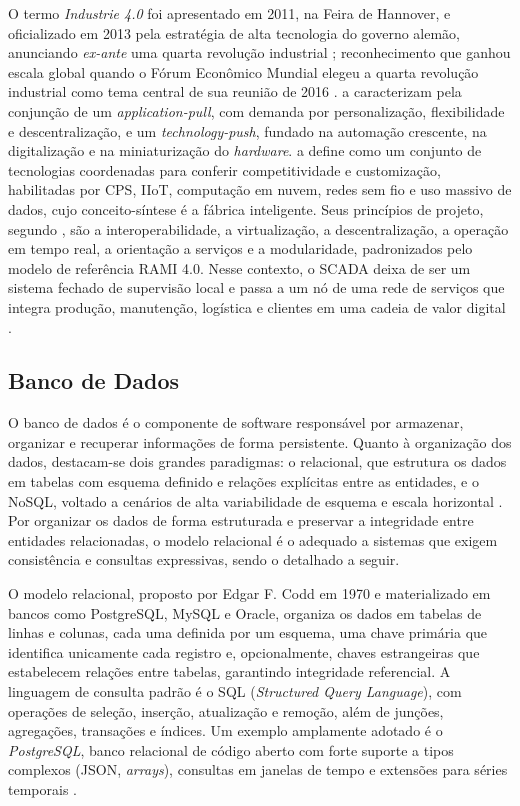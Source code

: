\par O termo \emph{Industrie 4.0} foi apresentado em 2011, na Feira de Hannover, e oficializado em 2013 pela estratégia de alta tecnologia do governo alemão, anunciando \emph{ex-ante} uma quarta revolução industrial \cite{PISCHING2017,BIGHETI2020}; reconhecimento que ganhou escala global quando o Fórum Econômico Mundial elegeu a quarta revolução industrial como tema central de sua reunião de 2016 \cite{WEF_DAVOS_2016_THEME}. \textcite{LASI_INDUSTRY_40} a caracterizam pela conjunção de um \emph{application-pull}, com demanda por personalização, flexibilidade e descentralização, e um \emph{technology-push}, fundado na automação crescente, na digitalização e na miniaturização do \textit{hardware}. \textcite{BIGHETI2020} a define como um conjunto de tecnologias coordenadas para conferir competitividade e customização, habilitadas por CPS, IIoT, computação em nuvem, redes sem fio e uso massivo de dados, cujo conceito-síntese é a fábrica inteligente. Seus princípios de projeto, segundo \textcite{PISCHING2017}, são a interoperabilidade, a virtualização, a descentralização, a operação em tempo real, a orientação a serviços e a modularidade, padronizados pelo modelo de referência RAMI 4.0. Nesse contexto, o SCADA deixa de ser um sistema fechado de supervisão local e passa a um nó de uma rede de serviços que integra produção, manutenção, logística e clientes em uma cadeia de valor digital \cite{BIGHETI2020,COLOMBO2014_STATE_ART_AUTOMATION}.

\subsection{Banco de Dados}

\par O banco de dados é o componente de software responsável por armazenar, organizar e recuperar informações de forma persistente. Quanto à organização dos dados, destacam-se dois grandes paradigmas: o relacional, que estrutura os dados em tabelas com esquema definido e relações explícitas entre as entidades, e o NoSQL, voltado a cenários de alta variabilidade de esquema e escala horizontal \cite{MOHAMED2014_RELATIONAL_VS_NOSQL}. Por organizar os dados de forma estruturada e preservar a integridade entre entidades relacionadas, o modelo relacional é o adequado a sistemas que exigem consistência e consultas expressivas, sendo o detalhado a seguir.

\par O modelo relacional, proposto por Edgar F. Codd em 1970 e materializado em bancos como PostgreSQL, MySQL e Oracle, organiza os dados em tabelas de linhas e colunas, cada uma definida por um esquema, uma chave primária que identifica unicamente cada registro e, opcionalmente, chaves estrangeiras que estabelecem relações entre tabelas, garantindo integridade referencial. A linguagem de consulta padrão é o SQL (\emph{Structured Query Language}), com operações de seleção, inserção, atualização e remoção, além de junções, agregações, transações e índices. Um exemplo amplamente adotado é o \emph{PostgreSQL}, banco relacional de código aberto com forte suporte a tipos complexos (JSON, \emph{arrays}), consultas em janelas de tempo e extensões para séries temporais \cite{POSTGRESQL_DOCS}.

